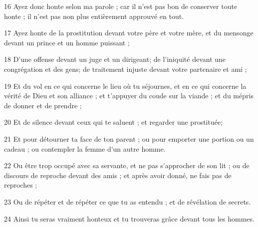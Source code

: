 \par 16 Ayez donc honte selon ma parole ; car il n'est pas bon de conserver toute honte ; il n’est pas non plus entièrement approuvé en tout.
\par 17 Ayez honte de la prostitution devant votre père et votre mère, et du mensonge devant un prince et un homme puissant ;
\par 18 D'une offense devant un juge et un dirigeant; de l'iniquité devant une congrégation et des gens; de traitement injuste devant votre partenaire et ami ;
\par 19 Et du vol en ce qui concerne le lieu où tu séjournes, et en ce qui concerne la vérité de Dieu et son alliance ; et t'appuyer du coude sur la viande ; et du mépris de donner et de prendre ;
\par 20 Et de silence devant ceux qui te saluent ; et regarder une prostituée;
\par 21 Et pour détourner ta face de ton parent ; ou pour emporter une portion ou un cadeau ; ou contempler la femme d'un autre homme.
\par 22 Ou être trop occupé avec sa servante, et ne pas s'approcher de son lit ; ou de discours de reproche devant des amis ; et après avoir donné, ne fais pas de reproches ;
\par 23 Ou de répéter et de répéter ce que tu as entendu ; et de révélation de secrets.
\par 24 Ainsi tu seras vraiment honteux et tu trouveras grâce devant tous les hommes.


